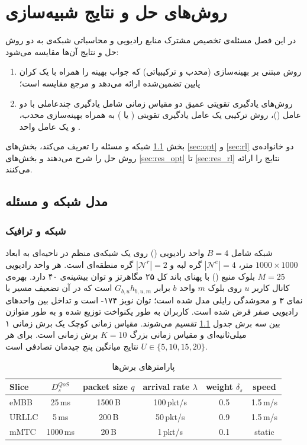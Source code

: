 \documentclass[12pt,oneside]{report}
\newcommand{\cN}{\mathcal{N}}
\begin{document}
\chapter{روش‌های حل و نتایج شبیه‌سازی}\label{ch:results}

در این فصل مسئله‌ی تخصیص مشترک منابع رادیویی و محاسباتی شبکه‌ی  به دو روش حل و نتایج آن‌ها مقایسه می‌شود:
\begin{enumerate}
	\item روش مبتنی بر بهینه‌سازی (محدب و ترکیبیاتی) که جواب بهینه را همراه با یک کران پایین تضمین‌شده ارائه می‌دهد و مرجع مقایسه است؛
	\item روش‌های یادگیری تقویتی عمیق دو مقیاس زمانی شامل یادگیری چندعاملی با دو عامل  ()، روش ترکیبی یک عامل یادگیری تقویتی ( یا ) به همراه بهینه‌سازی محدب، و یک عامل واحد .
\end{enumerate}
بخش \ref{sec:setup} شبکه و مسئله را تعریف می‌کند، بخش‌های \ref{sec:opt} و \ref{sec:rl} دو خانواده‌ی روش حل را شرح می‌دهند و بخش‌های \ref{sec:res_opt} تا \ref{sec:res_rl} نتایج را ارائه می‌کنند.

\section{مدل شبکه و مسئله}\label{sec:setup}

\subsection{شبکه و ترافیک}
شبکه شامل $B=4$ واحد رادیویی () روی یک شبکه‌ی منظم در ناحیه‌ای به ابعاد $1000\times1000$ متر، $|\cN^e|=4$ گره لبه و $|\cN^r|=2$ گره منطقه‌ای  است.
هر واحد رادیویی $M=25$ بلوک منبع () با پهنای باند کل ۲۵ مگاهرتز و توان بیشینه‌ی ۴۰  دارد.
بهره‌ی کانال کاربر $u$ روی بلوک $m$ واحد $b$ برابر $G_{b,u}h_{b,u,m}$ است که در آن تضعیف مسیر با نمای ۳ و محوشدگی رایلی مدل شده است؛ توان نویز ۱۷۴-  است و تداخل بین واحدهای رادیویی صفر فرض شده است.
کاربران به طور یکنواخت توزیع شده و به طور متوازن بین سه برش جدول \ref{tab:slices} تقسیم می‌شوند.
مقیاس زمانی کوچک یک برش زمانی ۱ میلی‌ثانیه‌ای و مقیاس زمانی بزرگ $K=10$ برش زمانی است. برای هر $U\in\{5,10,15,20\}$ نتایج میانگین پنج چیدمان تصادفی است.

\begin{table}[H]
	\centering
	\caption{پارامترهای برش‌ها}\label{tab:slices}
	\begin{latin}
		\begin{tabular}{lccccc}
			\toprule
			Slice & $D_s^{QoS}$ & packet size $q$ & arrival rate $\lambda$ & weight $\delta_s$ & speed \\
			\midrule
			eMBB  & 25\,ms   & 1500\,B & 100\,pkt/s & 0.5 & 1.5\,m/s \\
			URLLC & 5\,ms    & 200\,B  & 50\,pkt/s  & 0.9 & 1.5\,m/s \\
			mMTC  & 1000\,ms & 20\,B   & 1\,pkt/s   & 0.1 & static \\
			\bottomrule
		\end{tabular}
	\end{latin}
\end{table}
\end{document}
